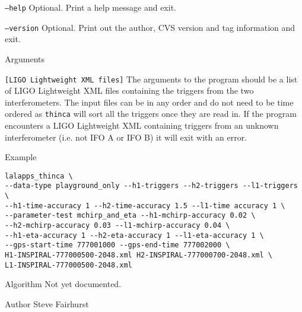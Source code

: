 \begin{entry}
\begin{entry}
\item[\texttt{--help}] Optional.  Print a help message and exit.

\item[\texttt{--version}] Optional.  Print out the author, CVS version and
tag information and exit.

\end{entry}

\item[Arguments]\leavevmode
\begin{entry}
\item[\texttt{[LIGO Lightweight XML files]}] The arguments to the program
should be a list of LIGO Lightweight XML files containing the triggers from
the two interferometers. The input files can be in any order and do not need
to be time ordered as \texttt{thinca} will sort all the triggers once they are
read in. If the program encounters a LIGO Lightweight XML containing triggers
from an unknown interferometer (i.e. not IFO A or IFO B) it will exit with an
error.
\end{entry}

\item[Example]
\begin{verbatim}
lalapps_thinca \
--data-type playground_only --h1-triggers --h2-triggers --l1-triggers \
--h1-time-accuracy 1 --h2-time-accuracy 1.5 --l1-time accuracy 1 \
--parameter-test mchirp_and_eta --h1-mchirp-accuracy 0.02 \
--h2-mchirp-accuracy 0.03 --l1-mchirp-accuracy 0.04 \ 
--h1-eta-accuracy 1 --h2-eta-accuracy 1 --l1-eta-accuracy 1 \
--gps-start-time 777001000 --gps-end-time 777002000 \
H1-INSPIRAL-777000500-2048.xml H2-INSPIRAL-777000700-2048.xml \
L1-INSPIRAL-777000500-2048.xml
\end{verbatim}

\item[Algorithm]
Not yet documented.


\item[Author] 
Steve Fairhurst
\end{entry}


